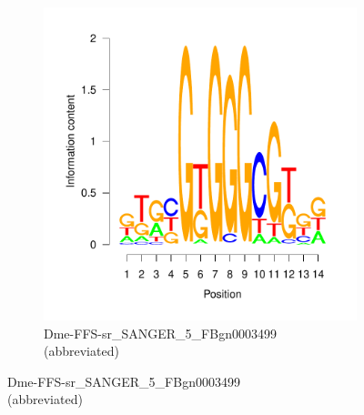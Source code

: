 \documentclass{article}
\begin{document}
\begin{figure}[htpb!]
\begin{subfigure}[b]{0.38\textwidth}
    \includegraphics[width=\textwidth]{MotifDb-logo2}
    \caption{Dme-FFS-sr\_SANGER\_5\_FBgn0003499\\(abbreviated)}
    \label{fig:Egr1-logo2}
    \end{subfigure}%
\end{figure}
\end{document}
